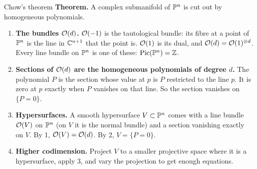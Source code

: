 \begin{frame}{Chow's theorem}
\label{fr:chow}
\textbf{Theorem.} A complex submanifold of \(\mathbb P^n\) is cut out by homogeneous polynomials.
\begin{enumerate}
\setlength{\itemsep}{4pt}
\item \textbf{The bundles \(\mathcal O(d)\).} \(\mathcal O(-1)\) is the tautological bundle: its fibre at a point of \(\mathbb P^n\) is the line in \(\mathbb C^{n+1}\) that the point is. \(\mathcal O(1)\) is its dual, and \(\mathcal O(d)=\mathcal O(1)^{\otimes d}\). Every line bundle on \(\mathbb P^n\) is one of these: \(\operatorname{Pic}(\mathbb P^n)=\mathbb Z\).
\item \textbf{Sections of \(\mathcal O(d)\) are the homogeneous polynomials of degree \(d\).} The polynomial \(P\) is the section whose value at \(p\) is \(P\) restricted to the line \(p\). It is zero at \(p\) exactly when \(P\) vanishes on that line. So the section vanishes on \(\{P=0\}\).
\item \textbf{Hypersurfaces.} A smooth hypersurface \(V\subset\mathbb P^n\) comes with a line bundle \(\mathcal O(V)\) on \(\mathbb P^n\) (on \(V\) it is the normal bundle) and a section vanishing exactly on \(V\). By 1, \(\mathcal O(V)=\mathcal O(d)\). By 2, \(V=\{P=0\}\).
\item \textbf{Higher codimension.} Project \(V\) to a smaller projective space where it is a hypersurface, apply 3, and vary the projection to get enough equations.
\end{enumerate}
\end{frame}


